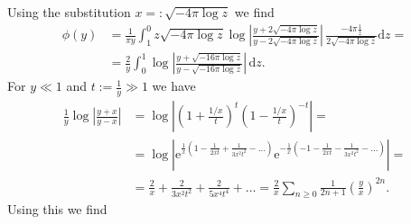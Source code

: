 \documentclass[english, parskip=full]{scrartcl}
\newcommand{\intx}{}
\newcommand{\kla}{}
\newcommand{\e}{\text{e}}
\begin{document}
Using the substitution $x =: \sqrt{-4\pi\log z}$ we find%
\begin{align}
\phi(y) &= \frac{1}{\pi y} \intx\int_{1}^{0} z \sqrt{-4\pi\log z} \log \left\vert \frac{y + 2\sqrt{-4\pi\log z}}{y - 2\sqrt{-4\pi\log z}} \right\vert \, \frac{-4\pi \frac{1}{z}}{2\sqrt{-4\pi\log z}} \mathrm{d}z = \\
&= \frac{2}{y} \intx\int_{0}^{1} \log \left\vert \frac{y + \sqrt{-16\pi\log z}}{y - \sqrt{-16\pi\log z}} \right\vert \, \mathrm{d}z.
\end{align}
For $y\ll 1$ and $t := \frac{1}{y} \gg 1$ we have
\begin{align}
\frac{1}{y} \log \left\vert \frac{y + x}{y - x} \right\vert &= \log \left\vert \left( 1 + \frac{1/x}{t} \right)^t \left( 1 - \frac{1/x}{t} \right)^{-t} \right\vert = \\
&= \log \left\vert \e^{\frac{1}{x} \kla\left( 1 - \frac{1}{2xt} + \frac{1}{3x^2t^2} - \dots \right)} \e^{-\frac{1}{x} \left( -1 - \frac{1}{2xt} - \frac{1}{3x^2t^2} - \dots \right)} \right\vert = \\
&= \frac{2}{x} + \frac{2}{3x^2t^2} + \frac{2}{5x^4t^4} + \dots = \frac{2}{x} \sum_{n\ge 0} \frac{1}{2n+1} \kla\left( \frac{y}{x} \right)^{2n}.
\end{align}
Using this we find
\end{document}

